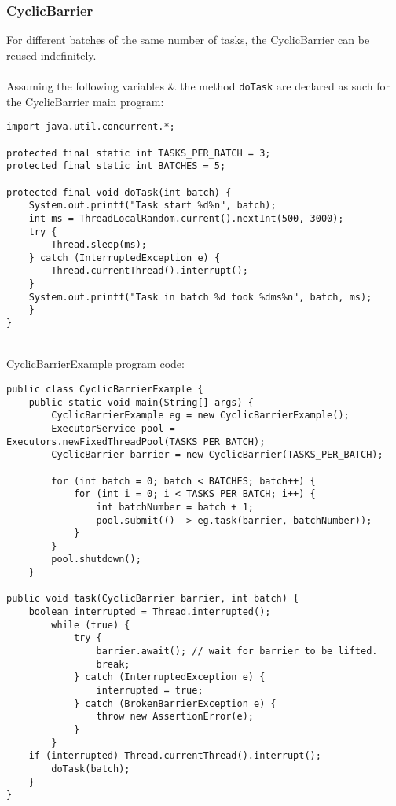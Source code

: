 \documentclass[a4paper]{article}
\begin{document}
\subsubsection{CyclicBarrier}
For different batches of the same number of tasks, the CyclicBarrier can be reused indefinitely.\\
\\
\noindent Assuming the following variables \& the method \texttt{doTask} are declared as such for the CyclicBarrier main program:
\newpage
\begin{verbatim}
import java.util.concurrent.*;

protected final static int TASKS_PER_BATCH = 3;
protected final static int BATCHES = 5;

protected final void doTask(int batch) {
	System.out.printf("Task start %d%n", batch);
	int ms = ThreadLocalRandom.current().nextInt(500, 3000);
	try {
		Thread.sleep(ms);
	} catch (InterruptedException e) {
		Thread.currentThread().interrupt();
	}
	System.out.printf("Task in batch %d took %dms%n", batch, ms);
	}
}
\end{verbatim}
\mbox{}\\
CyclicBarrierExample program code:
\begin{verbatim}
public class CyclicBarrierExample {
	public static void main(String[] args) {
		CyclicBarrierExample eg = new CyclicBarrierExample();
		ExecutorService pool = Executors.newFixedThreadPool(TASKS_PER_BATCH);
		CyclicBarrier barrier = new CyclicBarrier(TASKS_PER_BATCH);

		for (int batch = 0; batch < BATCHES; batch++) {
			for (int i = 0; i < TASKS_PER_BATCH; i++) {
				int batchNumber = batch + 1;
				pool.submit(() -> eg.task(barrier, batchNumber));
			}
		}
		pool.shutdown();
	}

public void task(CyclicBarrier barrier, int batch) {
	boolean interrupted = Thread.interrupted();
		while (true) {
			try {
				barrier.await(); // wait for barrier to be lifted.
				break;
			} catch (InterruptedException e) {
				interrupted = true;
			} catch (BrokenBarrierException e) {
				throw new AssertionError(e);
			}
		}
	if (interrupted) Thread.currentThread().interrupt();
		doTask(batch);
	}
}
\end{verbatim}
\end{document}
